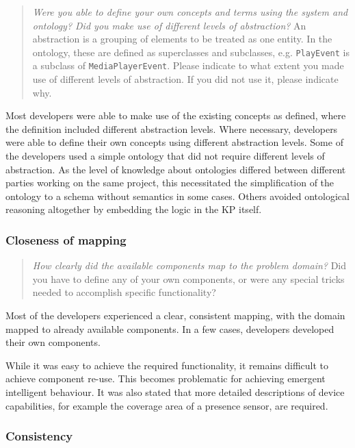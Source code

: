 \begin{quote}
	\emph{Were you able to define your own concepts and terms using the system and ontology? Did you make use of different levels of abstraction?} An abstraction is a grouping of elements to be treated as one entity. In the ontology, these are defined as superclasses and subclasses, e.g. \texttt{PlayEvent} is a subclass of \texttt{MediaPlayerEvent}. Please indicate to what extent you made use of different levels of abstraction. If you did not use it, please indicate why.
\end{quote}

Most developers were able to make use of the existing concepts as defined, where the definition included different abstraction levels. Where necessary, developers were able to define their own concepts using different abstraction levels. Some of the developers used a simple ontology that did not require different levels of abstraction. As the level of knowledge about ontologies differed between different parties working on the same project, this necessitated the simplification of the ontology to a schema without semantics in some cases. Others avoided ontological reasoning altogether by embedding the logic in the \ac{KP} itself.


\subsubsection{Closeness of mapping}
\label{resultsCloseness}

\begin{quote}
	\emph{How clearly did the available components map to the problem domain?}
	Did you have to define any of your own components, or were any special tricks needed to accomplish specific functionality?
\end{quote}


Most of the developers experienced a clear, consistent mapping, with the domain mapped to already available components. In a few cases, developers developed their own components.

While it was easy to achieve the required functionality, it remains difficult to achieve component re-use. This becomes problematic for achieving emergent intelligent behaviour. 
It was also stated that more detailed descriptions of device capabilities, for example the coverage area of a presence sensor, are required.


\subsubsection{Consistency}

